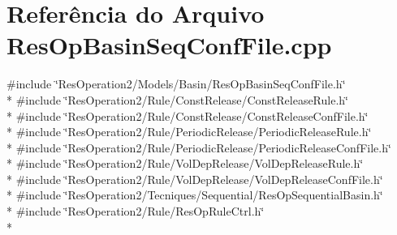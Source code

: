 \section{Referência do Arquivo Res\+Op\+Basin\+Seq\+Conf\+File.\+cpp}
\label{_res_op_basin_seq_conf_file_8cpp}
{\ttfamily \#include \char`\"{}Res\+Operation2/\+Models/\+Basin/\+Res\+Op\+Basin\+Seq\+Conf\+File.\+h\char`\"{}}\\*
{\ttfamily \#include \char`\"{}Res\+Operation2/\+Rule/\+Const\+Release/\+Const\+Release\+Rule.\+h\char`\"{}}\\*
{\ttfamily \#include \char`\"{}Res\+Operation2/\+Rule/\+Const\+Release/\+Const\+Release\+Conf\+File.\+h\char`\"{}}\\*
{\ttfamily \#include \char`\"{}Res\+Operation2/\+Rule/\+Periodic\+Release/\+Periodic\+Release\+Rule.\+h\char`\"{}}\\*
{\ttfamily \#include \char`\"{}Res\+Operation2/\+Rule/\+Periodic\+Release/\+Periodic\+Release\+Conf\+File.\+h\char`\"{}}\\*
{\ttfamily \#include \char`\"{}Res\+Operation2/\+Rule/\+Vol\+Dep\+Release/\+Vol\+Dep\+Release\+Rule.\+h\char`\"{}}\\*
{\ttfamily \#include \char`\"{}Res\+Operation2/\+Rule/\+Vol\+Dep\+Release/\+Vol\+Dep\+Release\+Conf\+File.\+h\char`\"{}}\\*
{\ttfamily \#include \char`\"{}Res\+Operation2/\+Tecniques/\+Sequential/\+Res\+Op\+Sequential\+Basin.\+h\char`\"{}}\\*
{\ttfamily \#include \char`\"{}Res\+Operation2/\+Rule/\+Res\+Op\+Rule\+Ctrl.\+h\char`\"{}}\\*
